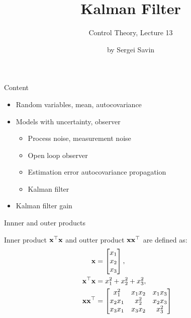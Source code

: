 \documentclass{beamer}
\title{Kalman Filter}
\subtitle{Control Theory, Lecture 13}
\author{by Sergei Savin}
\date{\mydate}
\begin{document}
\maketitle



\begin{frame}{Content}
\begin{itemize}
\item Random variables, mean, autocovariance
\item Models with uncertainty, observer
\begin{itemize}
	\item Process noise, measurement noise
	\item Open loop observer
	\item Estimation error autocovariance propagation
	\item Kalman filter
\end{itemize}
\item Kalman filter gain
\end{itemize}
\end{frame}




\begin{frame}{Innner and outer products}
	\begin{flushleft}
		
		Inner product $\mathbf{x}^\top \mathbf{x}$ and outter product $\mathbf{x}\mathbf{x}^\top$ are defined as:
		\begin{align*}
			\mathbf{x} &= 
			\begin{bmatrix}
				x_1 \\ x_2 \\ x_3
			\end{bmatrix},& 
			\\
			\mathbf{x}^\top \mathbf{x} &= x_1^2+x_2^2+x_3^2, 
			\\
			\mathbf{x}\mathbf{x}^\top &= 
			\begin{bmatrix}
				x_1^2    & x_1 x_2 & x_1 x_3 \\ 
				x_2 x_1 & x_2^2    & x_2 x_3 \\ 
				x_3 x_1 & x_3 x_2 & x_3^2
			\end{bmatrix}
		\end{align*}	
		
	\end{flushleft}
\end{frame}
\end{document}
